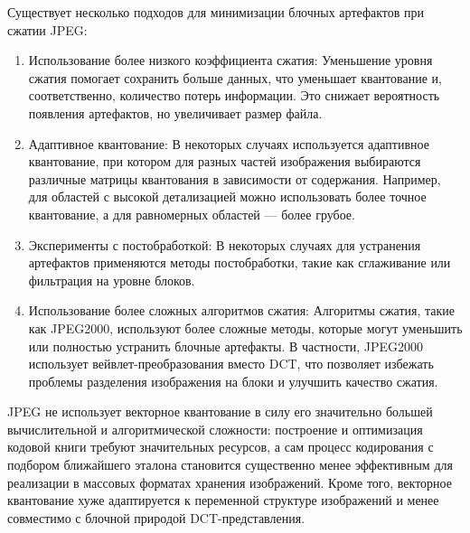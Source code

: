 Существует несколько подходов для минимизации блочных артефактов при сжатии JPEG:
\begin{enumerate}
    \item Использование более низкого коэффициента сжатия: Уменьшение уровня сжатия помогает сохранить больше данных, 
    что уменьшает квантование и, соответственно, количество потерь информации. 
    Это снижает вероятность появления артефактов, но увеличивает размер файла.

    \item Адаптивное квантование: В некоторых случаях используется адаптивное квантование, 
    при котором для разных частей изображения выбираются различные матрицы квантования в зависимости от содержания. 
    Например, для областей с высокой детализацией можно использовать более точное квантование, а для равномерных областей — более грубое.

    \item Эксперименты с постобработкой: В некоторых случаях для устранения артефактов применяются методы постобработки, такие как сглаживание или фильтрация на уровне блоков.

    \item Использование более сложных алгоритмов сжатия: Алгоритмы сжатия, такие как JPEG2000, 
    используют более сложные методы, которые могут уменьшить или полностью устранить блочные артефакты. 
    В частности, JPEG2000 использует вейвлет-преобразования вместо DCT, что позволяет избежать проблемы разделения изображения на блоки и улучшить качество сжатия.
\end{enumerate}

\vspace{1em}

JPEG не использует векторное квантование в силу его значительно большей вычислительной и алгоритмической сложности: 
построение и оптимизация кодовой книги требуют значительных ресурсов, 
а сам процесс кодирования с подбором ближайшего эталона становится существенно менее эффективным для реализации в массовых форматах хранения изображений. 
Кроме того, векторное квантование хуже адаптируется к переменной структуре изображений и менее совместимо с блочной природой DCT-представления.
